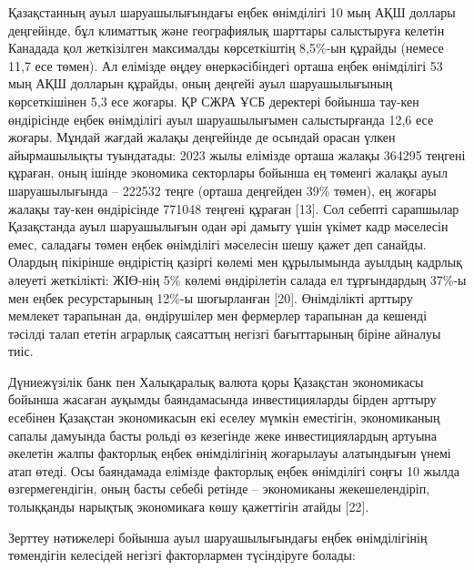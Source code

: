 \begin{multicols}{2}
Қазақстанның ауыл шаруашылығындағы еңбек өнімділігі 10 мың АҚШ доллары
деңгейінде, бұл климаттық және географиялық шарттары салыстыруға келетін
Канадада қол жеткізілген максималды көрсеткіштің 8,5\%-ын құрайды
(немесе 11,7 есе төмен). Ал елімізде өңдеу өнеркәсібіндегі орташа еңбек
өнімділігі 53 мың АҚШ долларын құрайды, оның деңгейі ауыл шаруашылығының
көрсеткішінен 5,3 есе жоғары. ҚР СЖРА ҰСБ деректері бойынша тау-кен
өндірісінде еңбек өнімділігі ауыл шаруашылығымен салыстырғанда 12,6 есе
жоғары. Мұндай жағдай жалақы деңгейінде де осындай орасан үлкен
айырмашылықты туындатады: 2023 жылы елімізде орташа жалақы 364295
теңгені құраған, оның ішінде экономика секторлары бойынша ең төменгі
жалақы ауыл шаруашылығында -- 222532 теңге (орташа деңгейден 39\%
төмен), ең жоғары жалақы тау-кен өндірісінде 771048 теңгені құраған
{[}13{]}. Сол себепті сарапшылар Қазақстанда ауыл шаруашылығын одан әрі
дамыту үшін үкімет кадр мәселесін емес, саладағы төмен еңбек өнімділігі
мәселесін шешу қажет деп санайды. Олардың пікірінше өндірістің қазіргі
көлемі мен құрылымында ауылдың кадрлық әлеуеті жеткілікті: ЖІӨ-нің 5\%
көлемі өндірілетін салада ел тұрғындардың 37\%-ы мен еңбек ресурстарының
12\%-ы шоғырланған {[}20{]}. Өнімділікті арттыру мемлекет тарапынан да,
өндірушілер мен фермерлер тарапынан да кешенді тәсілді талап ететін
аграрлық саясаттың негізгі бағыттарының біріне айналуы тиіс.

Дүниежүзілік банк пен Халықаралық валюта қоры Қазақстан экономикасы
бойынша жасаған ауқымды баяндамасында инвестицияларды бірден арттыру
есебінен Қазақстан экономикасын екі еселеу мүмкін еместігін,
экономиканың сапалы дамуында басты рольді өз кезегінде жеке
инвестициялардың артуына әкелетін жалпы факторлық еңбек өнімділігінің
жоғарылауы алатындығын үнемі атап өтеді. Осы баяндамада елімізде
факторлық еңбек өнімділігі соңғы 10 жылда өзгермегендігін, оның басты
себебі ретінде -- экономиканы жекешелендіріп, толыққанды нарықтық
экономикаға көшу қажеттігін атайды {[}22{]}.

Зерттеу нәтижелері бойынша ауыл шаруашылығындағы еңбек өнімділігінің
төмендігін келесідей негізгі факторлармен түсіндіруге болады:


\end{multicols}
